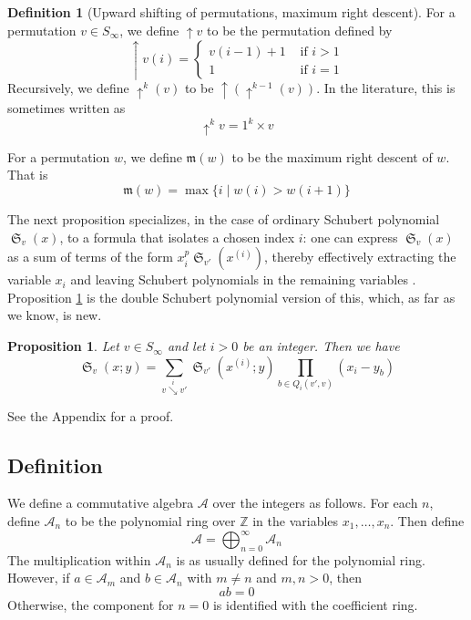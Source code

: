\documentclass[a4paper,fleqn]{cas-sc}
\newtheorem{proposition}[lemma]{Proposition}
\theoremstyle{definition}
\newtheorem{definition}[lemma]{Definition}
\theoremstyle{remark}
\numberwithin{equation}{subsection}
\DeclareMathOperator{\sch}{\mathfrak{S}}
\newcommand{\shup}{{\uparrow}}
\newcommand{\downvar}[1]{\stackrel{#1}{\searrow}}
\newcommand{\smpre}[2]{\ensuremath{}\prod_{b\in #2}(#1-b)}
\newcommand{\coma}{\mathcal{A}}
\newcommand{\maxd}{\mathfrak{m}}
\begin{document}
\begin{definition}[Upward shifting of permutations, maximum right descent]
		For a permutation $v\in S_\infty$, we define $\shup{v}$ to be the permutation defined by
		$$\shup{v}(i) = \begin{cases}
			v(i-1)+1&\mbox{ if }i>1\\
			1&\mbox{ if }i=1
		\end{cases}$$
		Recursively, we define $\shup^k(v)$ to be $\shup(\shup^{k-1}(v))$. In the literature, this is sometimes written as
    $$\shup^kv = 1^k\times v$$

		For a permutation $w$, we define $\maxd(w)$ to be the maximum right descent of $w$. That is
		$$\maxd(w) = \max\{i\mid w(i)>w(i+1)\}$$

	\end{definition}

	

The next proposition specializes, in the case of ordinary Schubert polynomial $\sch_v(x)$, to a formula that isolates a chosen index $i$: one can express $\sch_v(x)$ as a sum of terms of the form $x_i^p\sch_{v'}(x^{(i)})$, thereby effectively extracting the variable $x_i$ and leaving Schubert polynomials in the remaining variables \cite[Theorem~5.1]{bsskew}. Proposition \ref{proposition:pullindex} is the double Schubert polynomial version of this, which, as far as we know, is new.%

\begin{proposition} \label{proposition:pullindex}
Let $v\in S_\infty$ and let $i>0$ be an integer. Then we have
$$\sch_v(x;y)=\sum_{v\downvar{i} v'}\sch_{v'}(x^{(i)};y)\prod_{b\in Q_i(v',v)}(x_i - y_b)$$
\end{proposition}
See the Appendix for a proof.

\subsection{Definition}


We define a commutative algebra $\coma$ over the integers as follows. For each $n$, define $\coma_n$ to be the polynomial ring over $\mathbb{Z}$ in the variables $x_1,\ldots,x_n$. Then define
$$\coma =\bigoplus_{n=0}^\infty \coma_n$$
The multiplication within $\coma_n$ is as usually defined for the polynomial ring. However, if $a\in \coma_m$ and $b\in \coma_n$ with $m\neq n$ and $m,n>0$,  then
$$ab = 0$$
Otherwise, the component for $n=0$ is identified with the coefficient ring.
\end{document}
